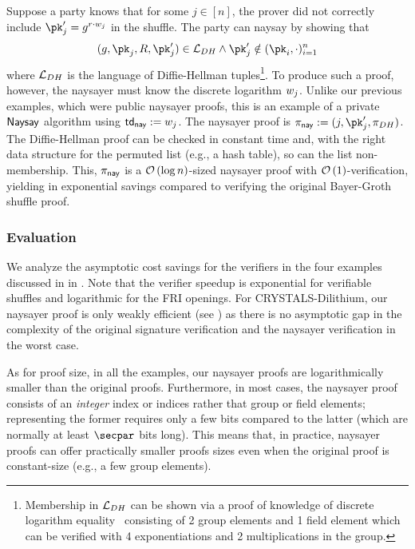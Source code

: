 Suppose a party knows that for some $j\in[n]$, the prover did not correctly include $\pk_j' = g^{r\cdot \witness_j}$ in the shuffle. The party can naysay by showing that 
\[
    (g,\pk_j,R,\pk_j')\in\Lang_{DH}\land \pk_j' \notin (\pk_i,\cdot)_{i=1}^n
\]
where $\mathcal{L}_{DH}$ is the language of Diffie-Hellman tuples\footnote{Membership in $\mathcal{L}_{DH}$ can be shown via a proof of knowledge of discrete logarithm equality~\cite{C:ChaPed92} consisting of 2 group elements and 1 field element which can be verified with 4 exponentiations and 2 multiplications in the group.}. To produce such a proof, however, the naysayer must know the discrete logarithm $w_j$. Unlike our previous examples, which were public naysayer proofs, this is an example of a private $\mathsf{Naysay}$ algorithm using $\mathsf{td}_{\mathsf{nay}} := w_j$. The naysayer proof is $\pi_\nay := (j, \pk_j', \pi_{DH})$. The Diffie-Hellman proof can be checked in constant time and, with the right data structure for the permuted list (e.g., a hash table), so can the list non-membership. This, $\pi_{\mathsf{nay}}$ is a $\mathcal{O}\left(\log{n}\right)$-sized naysayer proof with $\mathcal{O}\left(1\right)$-verification, yielding in exponential savings compared to verifying the original Bayer-Groth shuffle proof.

\subsubsection{Evaluation}
We analyze the asymptotic cost savings for the verifiers in the four examples discussed in  in . Note that the verifier speedup is exponential for verifiable shuffles and logarithmic for the FRI openings. For CRYSTALS-Dilithium, our naysayer proof is only weakly efficient (see ) as there is no asymptotic gap in the complexity of the original signature verification and the naysayer verification in the worst case.



As for proof size, in all the examples, our naysayer proofs are logarithmically smaller than the original proofs.
Furthermore, in most cases, the naysayer proof consists of an \emph{integer} index or indices rather that group or field elements; representing the former requires only a few bits compared to the latter (which are normally at least $\secpar$ bits long). This means that, in practice, naysayer proofs can offer practically smaller proofs sizes even when the original proof is constant-size (e.g., a few group elements). 